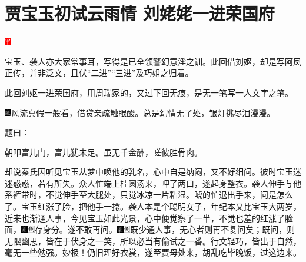 

\chapter{贾宝玉初试云雨情 刘姥姥一进荣国府}

\includegraphics[width=3mm]{../Images/00002}{\kaishu 宝玉、袭人亦大家常事耳，写得是已全领警幻意淫之训。此回借刘妪，却是写阿凤正传，并非泛文，且伏``二进''``三进''及巧姐之归着。

此回刘妪一进荣国府，用周瑞家的，又过下回无痕，是无一笔写一人文字之笔。

\includegraphics[width=3mm]{../Images/00005}风流真假一般看，借贷亲疏触眼酸。总是幻情无了处，银灯挑尽泪漫漫。}

题曰：

朝叩富儿门，富儿犹未足。虽无千金酬，嗟彼胜骨肉。

却说秦氏因听见宝玉从梦中唤他的乳名，心中自是纳闷，又不好细问。彼时宝玉迷迷惑惑，若有所失。众人忙端上桂圆汤来，呷了两口，遂起身整衣。袭人伸手与他系裤带时，不觉伸手至大腿处，只觉冰凉一片粘湿。唬的忙退出手来，问是怎么了。宝玉红涨了脸，把他手一捻。袭人本是个聪明女子，年纪本又比宝玉大两岁，近来也渐通人事，今见宝玉如此光景，心中便觉察了一半，不觉也羞的红涨了脸面，{\includegraphics[width=3mm]{../Images/00006}\includegraphics[width=3mm]{../Images/00011}\footnotesize \kaishu 存身分。}遂不敢再问。{\includegraphics[width=3mm]{../Images/00006}\includegraphics[width=3mm]{../Images/00011}\footnotesize \kaishu 既少通人事，无心者则再不复问矣；既问，则无限幽思，皆在于伏身之一笑，所以必当有偷试之一番。行文轻巧，皆出于自然，毫无一些勉强。妙极！}仍旧理好衣裳，遂至贾母处来，胡乱吃毕晚饭，过这边来。

